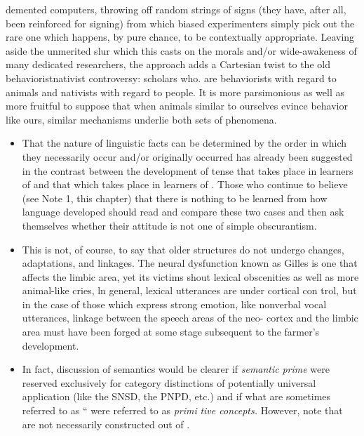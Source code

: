 \begin{itemize}
\begin{itemize}
\begin{itemize}
\begin{itemize}
\begin{itemize}
\begin{itemize}
\begin{itemize}
\begin{itemize}
\begin{itemize}
\begin{itemize}
\begin{itemize}
\begin{itemize}

demented computers, throwing off random strings of signs (they have, after all, been reinforced for signing) from which biased experimenters simply pick out the rare one which happens, by pure chance, to be contextually appropriate. Leaving aside the unmerited slur which this casts on the morals and/or wide-awakeness of many dedicated re\-searchers, the approach adds a Cartesian twist to the old behaviorist\-nativist controversy: scholars who. are behaviorists with regard to animals and nativists with regard to people. It is more parsimonious as well as more fruitful to suppose that when animals similar to our\-selves evince behavior like ours, similar mechanisms underlie both sets of phenomena.

\begin{itemize}
\item That the nature of linguistic facts can be determined by the order in which they necessarily occur and/or originally occurred has already been suggested in the contrast between the development of tense that takes place in learners of  and that which takes place in learners of . Those who continue to believe (see Note 1, this chapter) that there is nothing to be learned from  how language developed should read and compare these two cases and then ask themselves whether their attitude is not one of simple obscurantism.
\item This is not, of course, to say that older structures do not undergo changes, adaptations, and linkages. The neural dysfunction known as Gilles  is one that affects the limbic area, yet its victims shout lexical obscenities as well as more animal-like cries, ln general, lexical utterances are under cortical con trol, but in the case of those which express strong emotion, like non\-verbal vocal utterances, linkage between the speech areas of the neo- cortex and the limbic area must have been forged at some stage sub\-sequent to the farmer's development.
\item In fact, discussion of semantics would be clearer if \textit{semantic} \textit{prime} were reserved exclusively for category distinctions of potentially universal application (like the SNSD, the PNPD, etc.) and if what are sometimes referred to as `` were referred to as \textit{primi\-} \textit{tive concepts.} However, note that  are not necessarily constructed out of .
\end{itemize}


\end{itemize}
\end{itemize}
\end{itemize}
\end{itemize}
\end{itemize}
\end{itemize}
\end{itemize}
\end{itemize}
\end{itemize}
\end{itemize}
\end{itemize}
\end{itemize}
